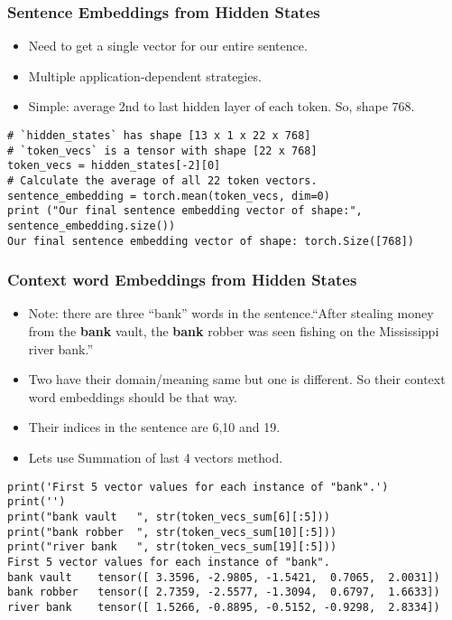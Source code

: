 \begin{frame}[fragile]\frametitle{Sentence Embeddings from Hidden States}

\begin{itemize}
\item Need to get a single vector for our entire sentence. 
\item Multiple application-dependent strategies.
\item Simple: average 2nd to last hidden layer of each token. So, shape $768$.
\end{itemize}

\begin{lstlisting}
# `hidden_states` has shape [13 x 1 x 22 x 768]
# `token_vecs` is a tensor with shape [22 x 768]
token_vecs = hidden_states[-2][0]
# Calculate the average of all 22 token vectors.
sentence_embedding = torch.mean(token_vecs, dim=0)
print ("Our final sentence embedding vector of shape:", sentence_embedding.size())
Our final sentence embedding vector of shape: torch.Size([768])
\end{lstlisting}
\end{frame}

\begin{frame}[fragile]\frametitle{Context word Embeddings from Hidden States}

\begin{itemize}
\item Note: there are three ``bank'' words in the sentence.``After stealing money from the {\bf bank} vault, the {\bf bank} robber was seen fishing on the Mississippi river bank.''
\item Two have their domain/meaning same but one is different. So their context word embeddings should be that way.
\item Their indices in the sentence are 6,10 and 19.
\item Lets use Summation of last 4 vectors method.
\end{itemize}

\begin{lstlisting}
print('First 5 vector values for each instance of "bank".')
print('')
print("bank vault   ", str(token_vecs_sum[6][:5]))
print("bank robber  ", str(token_vecs_sum[10][:5]))
print("river bank   ", str(token_vecs_sum[19][:5]))
First 5 vector values for each instance of "bank".
bank vault    tensor([ 3.3596, -2.9805, -1.5421,  0.7065,  2.0031])
bank robber   tensor([ 2.7359, -2.5577, -1.3094,  0.6797,  1.6633])
river bank    tensor([ 1.5266, -0.8895, -0.5152, -0.9298,  2.8334])
\end{lstlisting}
\end{frame}

